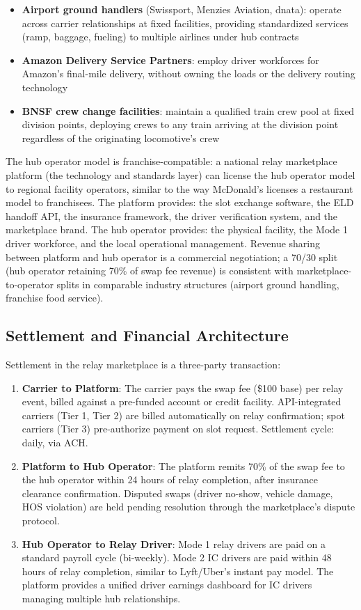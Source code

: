 \begin{itemize}
  \item \textbf{Airport ground handlers} (Swissport, Menzies Aviation, dnata): operate across carrier relationships at fixed facilities, providing standardized services (ramp, baggage, fueling) to multiple airlines under hub contracts
  \item \textbf{Amazon Delivery Service Partners}: employ driver workforces for Amazon's final-mile delivery, without owning the loads or the delivery routing technology
  \item \textbf{BNSF crew change facilities}: maintain a qualified train crew pool at fixed division points, deploying crews to any train arriving at the division point regardless of the originating locomotive's crew
\end{itemize}

The hub operator model is franchise-compatible: a national relay marketplace platform (the technology and standards layer) can license the hub operator model to regional facility operators, similar to the way McDonald's licenses a restaurant model to franchisees. The platform provides: the slot exchange software, the ELD handoff API, the insurance framework, the driver verification system, and the marketplace brand. The hub operator provides: the physical facility, the Mode 1 driver workforce, and the local operational management. Revenue sharing between platform and hub operator is a commercial negotiation; a 70/30 split (hub operator retaining 70\% of swap fee revenue) is consistent with marketplace-to-operator splits in comparable industry structures (airport ground handling, franchise food service).

\subsection{Settlement and Financial Architecture}

Settlement in the relay marketplace is a three-party transaction:

\begin{enumerate}
  \item \textbf{Carrier to Platform}: The carrier pays the swap fee (\$100 base) per relay event, billed against a pre-funded account or credit facility. API-integrated carriers (Tier 1, Tier 2) are billed automatically on relay confirmation; spot carriers (Tier 3) pre-authorize payment on slot request. Settlement cycle: daily, via ACH.
  \item \textbf{Platform to Hub Operator}: The platform remits 70\% of the swap fee to the hub operator within 24 hours of relay completion, after insurance clearance confirmation. Disputed swaps (driver no-show, vehicle damage, HOS violation) are held pending resolution through the marketplace's dispute protocol.
  \item \textbf{Hub Operator to Relay Driver}: Mode 1 relay drivers are paid on a standard payroll cycle (bi-weekly). Mode 2 IC drivers are paid within 48 hours of relay completion, similar to Lyft/Uber's instant pay model. The platform provides a unified driver earnings dashboard for IC drivers managing multiple hub relationships.
\end{enumerate}

